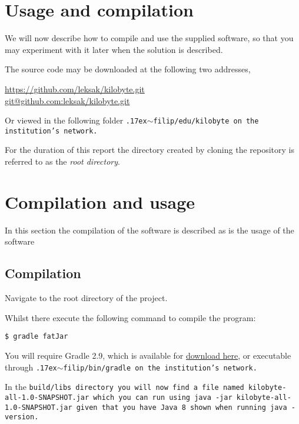 \section{Usage and compilation}

We will now describe how to compile and use the supplied software, so
that you may experiment with it later when the solution is described.

The source code may be downloaded at the following two addresses,

\begin{center}
\url{https://github.com/leksak/kilobyte.git} \\
\url{git@github.com:leksak/kilobyte.git}
\end{center}

Or viewed in the following folder
\tt{\raise.17ex\hbox{$\scriptstyle\mathtt{\sim}$}filip/edu/kilobyte}
on the institution's network.

For the duration of this report the directory created by cloning
the repository is referred to as the \emph{root directory}.

\section{Compilation and usage}

In this section the compilation of the software is described as
is the usage of the software

\subsection{Compilation}

Navigate to the root directory of the project.

Whilst there execute the following command to compile the program:

\begin{verbatim}
$ gradle fatJar
\end{verbatim}

You will require Gradle 2.9, which is available for
\href{http://gradle.org/gradle-download/}{download here}, or
executable through
\tt{\raise.17ex\hbox{$\scriptstyle\mathtt{\sim}$}filip/bin/gradle}
on the institution's network.

In the \tt{build/libs} directory you will now find a file named
\tt{kilobyte-all-1.0-SNAPSHOT.jar} which you can run using \tt{java -jar
  kilobyte-all-1.0-SNAPSHOT.jar} given that you have Java 8 shown when running
\tt{java -version}.

